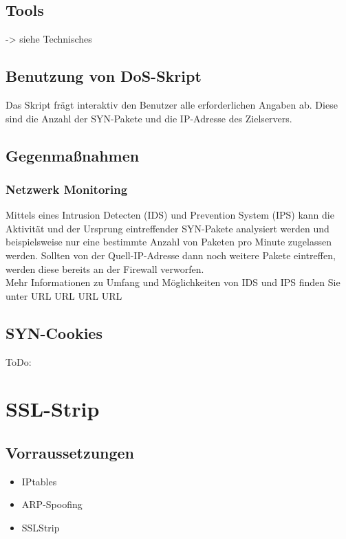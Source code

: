 \subsection*{Tools}
-> siehe Technisches

\subsection*{Benutzung von DoS-Skript}
Das Skript frägt interaktiv den Benutzer alle erforderlichen Angaben ab. Diese sind die Anzahl der SYN-Pakete und die IP-Adresse des Zielservers.

\subsection*{Gegenmaßnahmen}

\subsubsection*{Netzwerk Monitoring}
Mittels eines Intrusion Detecten (IDS) und Prevention System (IPS) kann die Aktivität und der Ursprung eintreffender SYN-Pakete analysiert werden und beispielsweise nur eine bestimmte Anzahl von Paketen pro
Minute zugelassen werden. Sollten von der Quell-IP-Adresse dann noch weitere Pakete eintreffen, werden diese bereits an der Firewall verworfen.\\
Mehr Informationen zu Umfang und Möglichkeiten von IDS und IPS finden Sie unter URL URL URL URL

\subsection*{SYN-Cookies}
ToDo: \newpage


\section{SSL-Strip}

\subsection*{Vorraussetzungen}

\begin{itemize}
\item IPtables
\item ARP-Spoofing
\item SSLStrip
\end{itemize}


